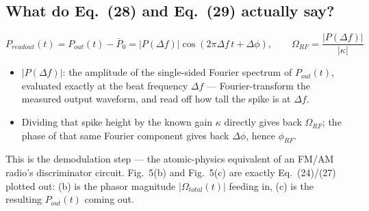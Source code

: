 \documentclass[11pt]{article}
\begin{document}
\subsection*{What do Eq.~(28) and Eq.~(29) actually say?}
\[
P_{readout}(t)=P_{out}(t)-\bar P_0 = |P(\Delta f)|\cos(2\pi\Delta f\,t+\Delta\phi), \qquad
\Omega_{RF}=\frac{|P(\Delta f)|}{|\kappa|}
\]
\begin{itemize}
\item $|P(\Delta f)|$: the amplitude of the single-sided Fourier spectrum of $P_{out}(t)$, evaluated exactly at the beat frequency $\Delta f$ --- Fourier-transform the measured output waveform, and read off how tall the spike is at $\Delta f$.
\item Dividing that spike height by the known gain $\kappa$ directly gives back $\Omega_{RF}$; the phase of that same Fourier component gives back $\Delta\phi$, hence $\phi_{RF}$.
\end{itemize}
\begin{simuse}
This is the demodulation step --- the atomic-physics equivalent of an FM/AM radio's discriminator circuit. Fig.~5(b) and Fig.~5(c) are exactly Eq.~(24)/(27) plotted out: (b) is the phasor magnitude $|\Omega_{total}(t)|$ feeding in, (c) is the resulting $P_{out}(t)$ coming out.
\end{simuse}
\end{document}
